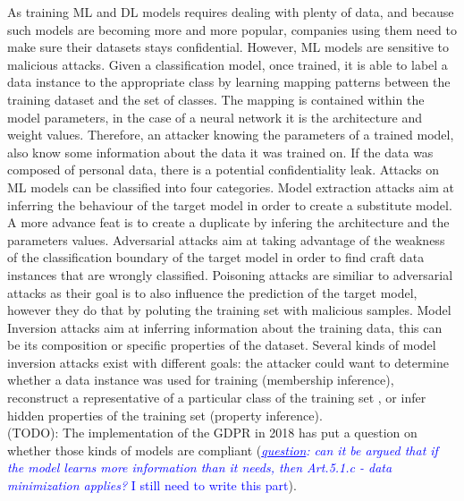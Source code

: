 \documentclass[11pt]{article}
\begin{document}
As training ML and DL models requires dealing with plenty of data, and because such models are becoming more and more popular, companies using them need to make sure their datasets stays confidential. However, ML models are sensitive to malicious attacks. Given a classification model, once trained, it is able to label a data instance to the appropriate class by learning mapping patterns between the training dataset and the set of classes. The mapping is contained within the model parameters, in the case of a neural network it is the architecture and weight values. Therefore, an attacker knowing the parameters of a trained model, also know some information about the data it was trained on. If the data was composed of personal data, there is a potential confidentiality leak. Attacks on ML models can be classified into four categories. Model extraction attacks aim at inferring the behaviour of the target model in order to create a substitute model. A more advance feat is to create a duplicate by infering the architecture and the parameters values. Adversarial attacks aim at taking advantage of the weakness of the classification boundary of the target model in order to find craft data instances that are wrongly classified. Poisoning attacks are similiar to adversarial attacks as their goal is to also influence the prediction of the target model, however they do that by poluting the training set with malicious samples. Model Inversion attacks aim at inferring information about the training data, this can be its composition or specific properties of the dataset. 
    Several kinds of model inversion attacks exist with different goals: the attacker could want to determine whether a data instance was used for training (membership inference)\cite{Shokri2017, Salem2019}, reconstruct a representative of a particular class of the training set \cite{Fredrikson2015}, or infer hidden properties of the training set (property inference)\cite{Ganju2018}.\\
    
    (TODO): The implementation of the GDPR in 2018 has put a question on whether those kinds of models are compliant (\textcolor{blue}{\textit{\underline{question}: can it be argued that if the model learns more information than it needs, then Art.5.1.c - data minimization applies?} I still need to write this part}).\\
    
\end{document}

